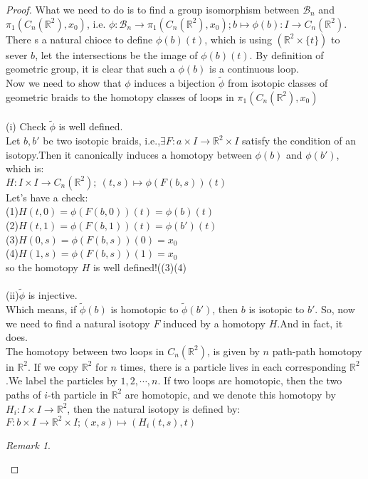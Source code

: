 \documentclass[UTF8]{ctexart}
\theoremstyle{definition}
\theoremstyle{remark}
\newtheorem*{remark}{Remark}
\begin{document}
\begin{proof}
	What we need to do is to find a group isomorphism between $\mathcal{B}_n$ and   $\pi_1(C_n(\mathbb{R}^2),x_0)$, i.e. $\phi:\mathcal{B}_n\rightarrow \pi_1(C_n(\mathbb{R}^2),x_0);b\mapsto \phi(b):I\rightarrow C_n(\mathbb{R}^2)$. There s a natural chioce to define $\phi(b)(t)$, which is using  $(\mathbb{R}^2\times \{t\})$ to sever $b$, let the intersections be the image of 
	$\phi(b)(t)$. By definition of geometric group, it is clear that such a $\phi(b)$ is a continuous loop.\\ Now we need to show that $\phi$ induces a bijection $\tilde{\phi}$ from isotopic classes of geometric braids to the homotopy classes of loops in $\pi_1(C_n(\mathbb{R}^2),x_0)$\\
	\\(i) Check $\tilde{\phi}$ is well defined.\\Let $b,b'$ be two isotopic braids, i.e.,$\exists F: a\times I\rightarrow \mathbb{R}^2\times I$ satisfy the condition of an isotopy.Then it canonically induces a homotopy between $\phi(b)$ and $\phi(b')$, which is:\\
	$H:I\times I \rightarrow C_n(\mathbb{R}^2);\ (t,s)\mapsto \phi(F(b,s))(t)$\\Let's have a check:\\
	(1)$H(t,0)=\phi(F(b,0))(t)=\phi(b)(t)$\\
	(2)$H(t,1)=\phi(F(b,1))(t)=\phi(b')(t)$\\
	(3)$H(0,s)=\phi(F(b,s))(0)=x_0$\\
	(4)$H(1,s)=\phi(F(b,s))(1)=x_0$\\
	so the homotopy $H$ is well defined!((3)(4) \\\\
	(ii)$\tilde{\phi}$ is injective.\\
	 Which means, if $\tilde{\phi}(b)$ is homotopic to $\tilde{\phi}(b')$, then $b$ is isotopic to $b'$. So, now we need to find a natural isotopy $F$ induced by a homotopy $H$.And in fact, it does.\\
The homotopy between two loops in $C_n(\mathbb{R}^2)$, is given by $n$ path-path homotopy in $\mathbb{R}^2$. If we copy $\mathbb{R}^2$ for $n$ times, there is a particle lives in each corresponding  $\mathbb{R}^2$.We label the particles by $1,2,\cdots,n$. If two loops are homotopic, then the two paths of $i$-th particle in $\mathbb{R}^2$ are homotopic, and we denote this homotopy by $H_i:I\times I\rightarrow \mathbb{R}^2$, then the natural isotopy is defined by: $F:b\times I\rightarrow \mathbb{R}^2\times I; (x,s)\mapsto (H_i(t,s),t)$\begin{remark}

\end{remark}
\end{proof}
\end{document}
